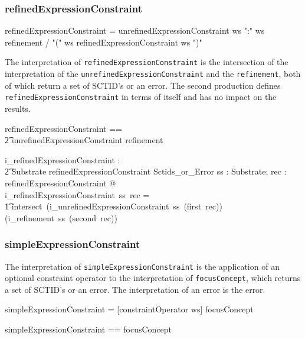 \documentclass{article}
\def\spec#1{{\tt #1}}
\def\bnf#1{{\scriptsize {{#1}} }}
\begin{document}
\subsubsection{refinedExpressionConstraint}
\begin{framed}
\noindent
\bnf{refinedExpressionConstraint = unrefinedExpressionConstraint ws ":" ws refinement / "(" ws refinedExpressionConstraint ws ")"}
\end{framed}

The interpretation of \spec{refinedExpressionConstraint} is the intersection of the interpretation of
the \spec{unrefinedExpressionConstraint} and the \spec{refinement}, both of which return a set of SCTID's or
an error.  The second production defines \spec{refinedExpressionConstraint} in terms of itself and has no impact on the results.

\begin{zed}
refinedExpressionConstraint == \\
\t2 unrefinedExpressionConstraint \cross refinement \\
\end{zed}

\begin{gendef}
   i\_refinedExpressionConstraint : \\
\t2 Substrate \fun refinedExpressionConstraint \fun Sctids\_or\_Error
\where
   \forall ss : Substrate; rec : refinedExpressionConstraint @ \\
   i\_refinedExpressionConstraint~ss~rec = \\
\t1 intersect~(i\_unrefinedExpressionConstraint~ss~(first~rec)) (i\_refinement~ss~(second~rec))
\end{gendef}


\subsubsection{simpleExpressionConstraint}
The interpretation of  \spec{simpleExpressionConstraint} is the application of an optional constraint 
operator to the interpretation of \spec{focusConcept}, which returns a set of SCTID's or an error.
The interpretation of an error is the error.


\begin{framed}
\noindent
\bnf{simpleExpressionConstraint =  [constraintOperator ws] focusConcept} \\
\end{framed}


\begin{zed}
simpleExpressionConstraint == \optional[constraintOperator] \cross focusConcept \\
\end{zed} 
\end{document}
